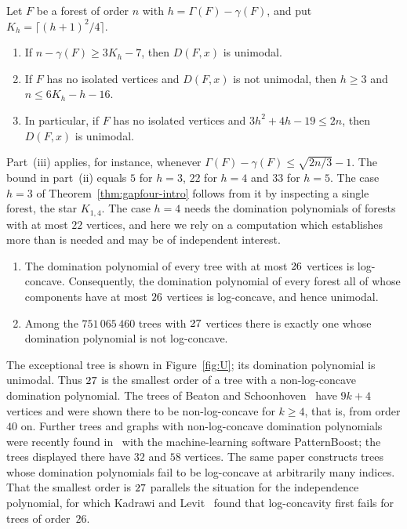\begin{theorem}\label{thm:criterion-intro}
Let $F$ be a forest of order $n$ with $h=\Gamma(F)-\gamma(F)$, and put
$K_h=\lceil (h+1)^2/4\rceil$.
\begin{enumerate}
\item[\textup{(i)}] If $n-\gamma(F)\ge 3K_h-7$, then $D(F,x)$ is unimodal.
\item[\textup{(ii)}] If $F$ has no isolated vertices and $D(F,x)$ is not
unimodal, then $h\ge 3$ and $n\le 6K_h-h-16$.
\item[\textup{(iii)}] In particular, if $F$ has no isolated vertices and
$3h^2+4h-19\le 2n$, then $D(F,x)$ is unimodal.
\end{enumerate}
\end{theorem}

Part~(iii) applies, for instance, whenever
$\Gamma(F)-\gamma(F)\le\sqrt{2n/3}-1$. The bound in part~(ii) equals $5$ for
$h=3$, $22$ for $h=4$ and $33$ for $h=5$. The case $h=3$ of
Theorem~\ref{thm:gapfour-intro} follows from it by inspecting a single
forest, the star $K_{1,4}$. The case $h=4$ needs the domination polynomials of
forests with at most $22$ vertices, and here we rely on a computation which
establishes more than is needed and may be of independent interest.

\begin{theorem}\label{thm:smalltrees-intro}
\begin{enumerate}
\item[\textup{(i)}] The domination polynomial of every tree with at most $26$
vertices is log-concave. Consequently, the domination polynomial of every
forest all of whose components have at most $26$ vertices is log-concave,
and hence unimodal.
\item[\textup{(ii)}] Among the $751\,065\,460$ trees with $27$ vertices
there is exactly one whose domination polynomial is not log-concave.
\end{enumerate}
\end{theorem}

The exceptional tree is shown in Figure~\ref{fig:U}; its domination polynomial
is unimodal. Thus $27$ is the smallest order of a tree with a
non-log-concave domination polynomial. The trees of Beaton and
Schoonhoven~\cite{BS} have $9k+4$ vertices and were shown there to be
non-log-concave for $k\ge4$, that is, from order $40$ on. Further trees and
graphs with non-log-concave domination polynomials were recently found
in~\cite{DHP} with the machine-learning software PatternBoost; the trees
displayed there have $32$ and $58$ vertices. The same paper constructs trees
whose domination polynomials fail to be log-concave at arbitrarily many
indices. That the smallest order is $27$ parallels the situation for
the independence polynomial, for which Kadrawi and Levit~\cite{KL} found that
log-concavity first fails for trees of order~$26$.


